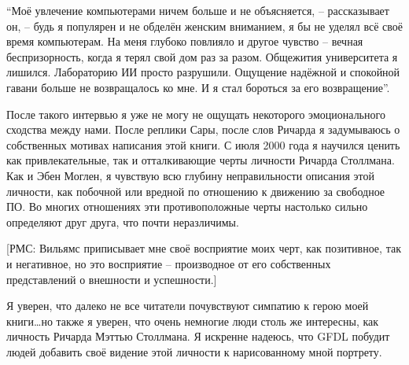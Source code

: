 \enquote{Моё увлечение компьютерами ничем больше и не объясняется, -- рассказывает он, -- будь я популярен и не обделён женским вниманием, я бы не уделял всё своё время компьютерам. На меня глубоко повлияло и другое чувство -- вечная беспризорность, когда я терял свой дом раз за разом. Общежития университета я лишился. Лабораторию ИИ просто разрушили. Ощущение надёжной и спокойной гавани больше не возвращалось ко мне. И я стал бороться за его возвращение}.

После такого интервью я уже не могу не ощущать некоторого эмоционального сходства между нами. После реплики Сары, после слов Ричарда я задумываюсь о собственных мотивах написания этой книги. С июля 2000 года я научился ценить как привлекательные, так и отталкивающие черты личности Ричарда Столлмана. Как и Эбен Моглен, я чувствую всю глубину неправильности описания этой личности, как побочной или вредной по отношению к движению за свободное ПО. Во многих отношениях эти противоположные черты настолько сильно определяют друг друга, что почти неразличимы.

[РМС: Вильямс приписывает мне своё восприятие моих черт, как позитивное, так и негативное, но это восприятие -- производное от его собственных представлений о внешности и успешности.]

Я уверен, что далеко не все читатели почувствуют симпатию к герою моей книги\ldots но также я уверен, что очень немногие люди столь же интересны, как личность Ричарда Мэттью Столлмана. Я искренне надеюсь, что GFDL побудит людей добавить своё видение этой личности к нарисованному мной портрету.
